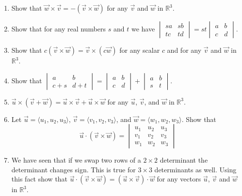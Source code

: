 \begin{enumerate}
\item  Show that $\vec{w} \times \vec{v} = -(\vec{v} \times \vec{w})$ for any $\vec{v}$ and $\vec{w}$ in $\mathbb{R}^3$.  \\

\item  Show that for any real numbers $s$ and $t$ we have $\begin{vmatrix}
sa & sb \\
tc & td
\end{vmatrix} = st \begin{vmatrix}
a & b \\
c & d
\end{vmatrix}$.  \\

\item  Show that $c (\vec{v} \times \vec{w}) = \vec{v} \times (c \vec{w})$ for any scalar $c$ and for any $\vec{v}$ and $\vec{w}$ in $\mathbb{R}^3$.  \\

\item  Show that 
$\begin{vmatrix}
a & b \\
c + s & d + t
\end{vmatrix} = \begin{vmatrix}
a & b \\
c & d
\end{vmatrix}
+ \begin{vmatrix}
a & b \\
s & t
\end{vmatrix}$. \\

\item  $\vec{u} \times (\vec{v} + \vec{w}) = \vec{u} \times \vec{v} + \vec{u} \times \vec{w}$ for any $\vec{u}$, $\vec{v}$, and $\vec{w}$ in $\mathbb{R}^3$.  \\

\item  Let $\vec{u} = \langle u_1, u_2, u_3 \rangle$, $\vec{v} = \langle v_1, v_2, v_3 \rangle$, and $\vec{w} = \langle w_1, w_2, w_3 \rangle$.  Show that
\[
\vec{u} \cdot ( \vec{v} \times \vec{w} ) = \begin{vmatrix}
u_1 & u_2 & u_3 \\
v_1 & v_2 & v_3 \\
w_1 & w_2 & w_3
\end{vmatrix} 
\]

\item  We have seen that if we swap two rows of a $2 \times 2$ determinant the determinant changes sign.  This is true for $3 \times 3$ determinants as well.  Using this fact show that $\vec{u} \cdot ( \vec{v} \times \vec{w} ) = ( \vec{u} \times \vec{v} ) \cdot \vec{w}$ for any vectors $\vec{u}$, $\vec{v}$ and $\vec{w}$ in $\mathbb{R}^3$.  \\


\end{enumerate}
